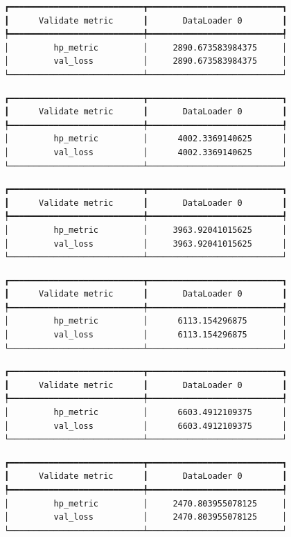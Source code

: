 \documentclass[
  letterpaper,
  DIV=11,
  numbers=noendperiod]{scrreprt}
\begin{document}
\begin{verbatim}
┏━━━━━━━━━━━━━━━━━━━━━━━━━━━┳━━━━━━━━━━━━━━━━━━━━━━━━━━━┓
┃      Validate metric      ┃       DataLoader 0        ┃
┡━━━━━━━━━━━━━━━━━━━━━━━━━━━╇━━━━━━━━━━━━━━━━━━━━━━━━━━━┩
│         hp_metric         │     2890.673583984375     │
│         val_loss          │     2890.673583984375     │
└───────────────────────────┴───────────────────────────┘
\end{verbatim}

\begin{verbatim}
┏━━━━━━━━━━━━━━━━━━━━━━━━━━━┳━━━━━━━━━━━━━━━━━━━━━━━━━━━┓
┃      Validate metric      ┃       DataLoader 0        ┃
┡━━━━━━━━━━━━━━━━━━━━━━━━━━━╇━━━━━━━━━━━━━━━━━━━━━━━━━━━┩
│         hp_metric         │      4002.3369140625      │
│         val_loss          │      4002.3369140625      │
└───────────────────────────┴───────────────────────────┘
\end{verbatim}

\begin{verbatim}
┏━━━━━━━━━━━━━━━━━━━━━━━━━━━┳━━━━━━━━━━━━━━━━━━━━━━━━━━━┓
┃      Validate metric      ┃       DataLoader 0        ┃
┡━━━━━━━━━━━━━━━━━━━━━━━━━━━╇━━━━━━━━━━━━━━━━━━━━━━━━━━━┩
│         hp_metric         │     3963.92041015625      │
│         val_loss          │     3963.92041015625      │
└───────────────────────────┴───────────────────────────┘
\end{verbatim}

\begin{verbatim}
┏━━━━━━━━━━━━━━━━━━━━━━━━━━━┳━━━━━━━━━━━━━━━━━━━━━━━━━━━┓
┃      Validate metric      ┃       DataLoader 0        ┃
┡━━━━━━━━━━━━━━━━━━━━━━━━━━━╇━━━━━━━━━━━━━━━━━━━━━━━━━━━┩
│         hp_metric         │      6113.154296875       │
│         val_loss          │      6113.154296875       │
└───────────────────────────┴───────────────────────────┘
\end{verbatim}

\begin{verbatim}
┏━━━━━━━━━━━━━━━━━━━━━━━━━━━┳━━━━━━━━━━━━━━━━━━━━━━━━━━━┓
┃      Validate metric      ┃       DataLoader 0        ┃
┡━━━━━━━━━━━━━━━━━━━━━━━━━━━╇━━━━━━━━━━━━━━━━━━━━━━━━━━━┩
│         hp_metric         │      6603.4912109375      │
│         val_loss          │      6603.4912109375      │
└───────────────────────────┴───────────────────────────┘
\end{verbatim}

\begin{verbatim}
┏━━━━━━━━━━━━━━━━━━━━━━━━━━━┳━━━━━━━━━━━━━━━━━━━━━━━━━━━┓
┃      Validate metric      ┃       DataLoader 0        ┃
┡━━━━━━━━━━━━━━━━━━━━━━━━━━━╇━━━━━━━━━━━━━━━━━━━━━━━━━━━┩
│         hp_metric         │     2470.803955078125     │
│         val_loss          │     2470.803955078125     │
└───────────────────────────┴───────────────────────────┘
\end{verbatim}
\end{document}

